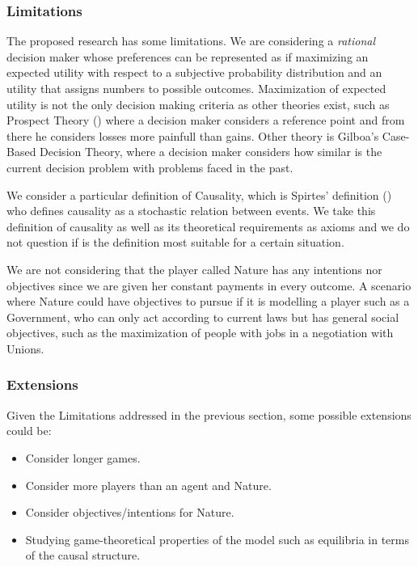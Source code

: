 \documentclass[english,letterpaper,12pt,final]{article}
\theoremstyle{definition}
\begin{document}
		\subsubsection{Limitations}
		The proposed research has some limitations. We are considering a \textit{rational} decision maker whose preferences can be represented as if maximizing an expected utility with respect to a subjective probability distribution and an utility that assigns numbers to possible outcomes. Maximization of expected utility is not the only decision making criteria as other theories exist, such as Prospect Theory (\cite{kahneman1979prospect}) where a decision maker considers a reference point and from there he considers losses more painfull than gains. Other theory is Gilboa's Case-Based Decision Theory, where a decision maker considers how similar is the current decision problem with problems faced in the past. 
		
		We consider a particular definition of Causality, which is Spirtes' definition (\cite{spirtes2000causation}) who defines causality as a stochastic relation between events. We take this definition of causality as well as its theoretical requirements as axioms and we do not question if is the definition most suitable for a certain situation.
		
		We are not considering that the player called Nature has any intentions nor objectives since we are given her constant payments in every outcome. A scenario where Nature could have objectives to pursue if it is modelling a player such as a Government, who can only act according to current laws but has general social objectives, such as the maximization of people with jobs in a negotiation with Unions.
		
		\subsubsection{Extensions}
		Given the Limitations addressed in the previous section, some possible extensions could be:
		\begin{itemize}
		\item Consider longer games.
		\item Consider more players than an agent and Nature.
		\item Consider objectives/intentions for Nature.
		\item Studying game-theoretical properties of the model such as equilibria in terms of the causal structure.
		\end{itemize}
		
\end{document}
